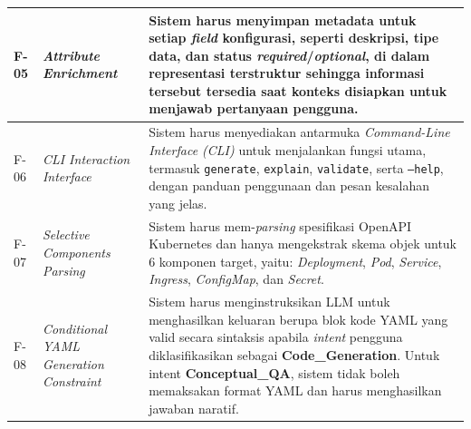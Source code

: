 \begin{longtable}{ | p{} | p{} | p{} |}
F-05 & \textit{Attribute Enrichment} & Sistem harus menyimpan metadata untuk setiap \textit{field} konfigurasi, seperti deskripsi, tipe data, dan status \textit{required}/\textit{optional}, di dalam representasi terstruktur sehingga informasi tersebut tersedia saat konteks disiapkan untuk menjawab pertanyaan pengguna. \\
\hline

F-06 & \textit{CLI Interaction Interface} &
Sistem harus menyediakan antarmuka \textit{Command-Line Interface (CLI)}
untuk menjalankan fungsi utama, termasuk \texttt{generate}, \texttt{explain},
\texttt{validate}, serta \texttt{--help}, dengan panduan penggunaan dan
pesan kesalahan yang jelas. \\
\hline

F-07 & \textit{Selective Components Parsing} & Sistem harus mem-\textit{parsing} spesifikasi OpenAPI Kubernetes dan hanya mengekstrak skema objek untuk 6 komponen target, yaitu: \textit{Deployment}, \textit{Pod}, \textit{Service}, \textit{Ingress}, \textit{ConfigMap}, dan \textit{Secret}. \\ 
\hline

F-08 & \textit{Conditional YAML Generation Constraint} & Sistem harus menginstruksikan LLM untuk menghasilkan keluaran berupa blok kode YAML yang valid secara sintaksis apabila \textit{intent} pengguna diklasifikasikan sebagai \textbf{Code\_Generation}. Untuk intent \textbf{Conceptual\_QA}, sistem tidak boleh memaksakan format YAML dan harus menghasilkan jawaban naratif. \\
\hline


\end{longtable}
